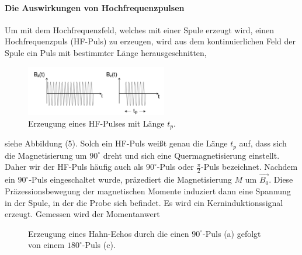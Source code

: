 \paragraph{Die Auswirkungen von Hochfrequenzpulsen}
Um mit dem Hochfrequenzfeld, welches mit einer Spule erzeugt wird, einen Hochfrequenzpuls (HF-Puls) zu erzeugen, wird aus dem kontinuierlichen Feld der Spule ein Puls mit bestimmter L\"{a}nge herausgeschnitten,  
\begin{figure}[hbtp]
	\centering
	\vspace{-10pt}
	\includegraphics[width=0.55\textwidth]{Plots/HFPuls.png} 
	\caption{Erzeugung eines HF-Pulses mit L\"{a}nge $t_p$.}
\end{figure}
siehe Abbildung (5).
Solch ein HF-Puls wei{\ss}t genau die L\"{a}nge $t_p$ auf, dass sich die Magnetisierung um $90^{\circ}$ dreht und sich eine Quermagnetisierung einstellt.
Daher wir der HF-Puls h\"{a}ufig auch als $90^{\circ}$-Puls oder $\frac{\pi}{2}$-Puls bezeichnet.
Nachdem ein $90^{\circ}$-Puls eingeschaltet wurde, pr\"{a}zediert die Magnetisierung $M$ um $\overrightarrow{B_0}$.
Diese Pr\"{a}zessionsbewegung der magnetischen Momente induziert dann eine Spannung in der Spule, in der die Probe sich befindet.
Es wird ein Kerninduktionssignal erzeugt.
Gemessen wird der Momentanwert 
\begin{figure}
	\vspace{-5pt}
	\centering
	\caption{Erzeugung eines Hahn-Echos durch die einen $90^{\circ}$-Puls (a) gefolgt von einem $180^{\circ}$-Puls (c).}
	\label{HahnEcho}
\end{figure}

